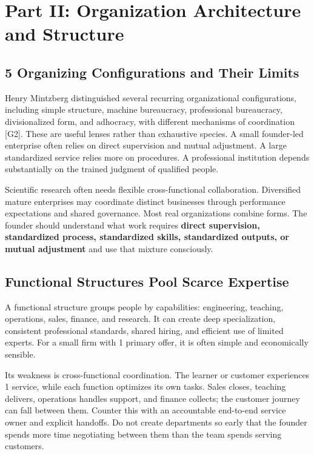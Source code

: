\section*{Part II: Organization Architecture and Structure}

\subsection{5 Organizing Configurations and Their Limits}
\label{sec:five_organizing_configurations}

Henry Mintzberg distinguished several recurring organizational configurations, including simple structure, machine bureaucracy, professional bureaucracy, divisionalized form, and adhocracy, with different mechanisms of coordination [G2]. These are useful lenses rather than exhaustive species. A small founder-led enterprise often relies on direct supervision and mutual adjustment. A large standardized service relies more on procedures. A professional institution depends substantially on the trained judgment of qualified people.

Scientific research often needs flexible cross-functional collaboration. Diversified mature enterprises may coordinate distinct businesses through performance expectations and shared governance. Most real organizations combine forms. The founder should understand what work requires \textbf{direct supervision, standardized process, standardized skills, standardized outputs, or mutual adjustment} and use that mixture consciously.

\subsection{Functional Structures Pool Scarce Expertise}
\label{sec:functional_structures}

A functional structure groups people by capabilities: engineering, teaching, operations, sales, finance, and research. It can create deep specialization, consistent professional standards, shared hiring, and efficient use of limited experts. For a small firm with 1 primary offer, it is often simple and economically sensible.

Its weakness is cross-functional coordination. The learner or customer experiences 1 service, while each function optimizes its own tasks. Sales closes, teaching delivers, operations handles support, and finance collects; the customer journey can fall between them. Counter this with an accountable end-to-end service owner and explicit handoffs. Do not create departments so early that the founder spends more time negotiating between them than the team spends serving customers.

